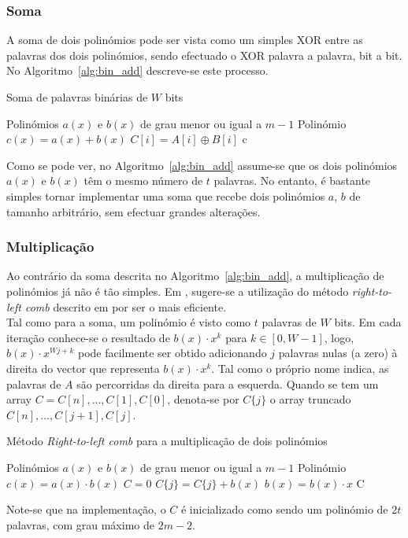 \subsubsection{Soma}
A soma de dois polinómios pode ser vista como um simples \textsf{XOR} entre as palavras dos dois polinómios, sendo efectuado o \textsf{XOR} palavra a palavra, bit a bit. No Algoritmo~\ref{alg:bin_add} descreve-se este processo.\\
\begin{algorithm}[htb!]
  \caption{Soma de palavras binárias de $W$ bits}\label{alg:bin_add}
  \begin{algorithmic}
    \Require Polinómios $a(x)$ e $b(x)$ de grau menor ou igual a $m-1$
    \Ensure Polinómio $c(x) = a(x) + b(x)$
    \State    $C[i] = A[i] \oplus B[i]$
    \EndFor
    \State \Return c
  \end{algorithmic}
\end{algorithm}%
Como se pode ver, no Algoritmo~\ref{alg:bin_add} assume-se que os dois polinómios $a(x)$ e $b(x)$ têm o mesmo número de $t$ palavras. No entanto, é bastante simples tornar implementar uma soma que recebe dois polinómios $a$, $b$ de tamanho arbitrário, sem efectuar grandes alterações.
\subsubsection{Multiplicação}
Ao contrário da soma descrita no Algoritmo~\ref{alg:bin_add}, a multiplicação de polinómios já não é tão simples. Em \cite{lapin}, sugere-se a utilização do método \textit{right-to-left comb} descrito em \cite{Hankerson:2003:GEC:940321} por ser o mais eficiente.\\
Tal como para a soma, um polinómio é visto como $t$ palavras de $W$ bits. Em cada iteração conhece-se o resultado de $b(x) \cdot x^k$ para $k \in [0, W-1]$, logo, $b(x) \cdot x^{Wj+k}$ pode facilmente ser obtido adicionando $j$ palavras nulas (a zero) à direita do vector que representa $b(x) \cdot x^k$. Tal como o próprio nome indica, as palavras de $A$ são percorridas da direita para a esquerda. Quando se tem um array $C = C[n],\dotsc,C[1],C[0]$, denota-se por $C\{j\}$ o array truncado $C[n],\dotsc,C[j+1],C[j]$.\\
\begin{algorithm}[htb!]
  \caption{Método \textit{Right-to-left comb} para a multiplicação de dois polinómios}\label{alg:right_to_left}
  \begin{algorithmic}
    \Require Polinómios $a(x)$ e $b(x)$ de grau menor ou igual a $m-1$
    \Ensure Polinómio $c(x) = a(x) \cdot b(x)$
    \State $C = 0$
        \State $C\{j\} = C\{j\} + b(x)$
        \EndIf
      \EndFor
      \State $b(x) = b(x) \cdot x$
      \EndIf
    \EndFor
    \State \Return C
  \end{algorithmic}
\end{algorithm}
Note-se que na implementação, o $C$ é inicializado como sendo um polinómio de $2t$ palavras, com grau máximo de $2m - 2$.
